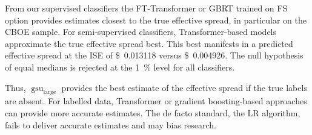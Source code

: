 From our supervised classifiers the FT-Transformer or \gls{GBRT} trained on \gls{FS} option provides estimates closest to the true effective spread, in particular on the \gls{CBOE} sample. For semi-supervised classifiers, Transformer-based models approximate the true effective spread best. This best manifests in a predicted effective spread at the \gls{ISE} of \SI[round-mode=places, round-precision=3]{0.013118}[\$]{} versus \SI[round-mode=places, round-precision=3]{0.004926}[\$]{}. The null hypothesis of equal medians is rejected at the \SI{1}{\percent} level for all classifiers.

Thus, $\operatorname{gsu}_{\mathrm{large}}$ provides the best estimate of the effective spread if the true labels are absent. For labelled data, Transformer or gradient boosting-based approaches can provide more accurate estimates. The de facto standard, the \gls{LR} algorithm, fails to deliver accurate estimates and may bias research.


